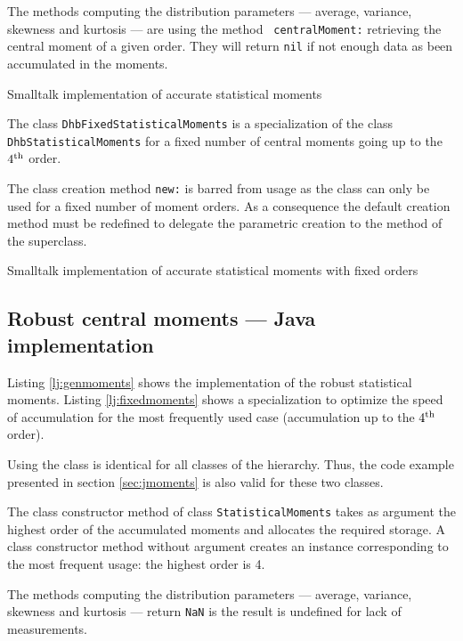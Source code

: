 \documentclass[twoside]{book}
\begin{document}
The methods computing the distribution parameters --- average,
variance, skewness and kurtosis --- are using the method {\tt
centralMoment:} retrieving the central moment of a given order.
They will return {\tt nil} if not enough data as been accumulated
in the moments.

\begin{listing} Smalltalk implementation of accurate statistical moments \label{ls:genmoments}

\end{listing}

The class {\tt DhbFixedStatisticalMoments} is a specialization of
the class {\tt DhbStatisticalMoments} for a fixed number of
central moments going up to the $4^{\mathop{\rm th}}$ order.

The class creation method {\tt new:} is barred from usage as the
class can only be used for a fixed number of moment orders. As a
consequence the default creation method must be redefined to
delegate the parametric creation to the method of the superclass.

\begin{listing} Smalltalk implementation of accurate statistical moments with fixed orders \label{ls:fixedmoments}

\end{listing}

\subsection{Robust central moments --- Java
implementation} \label{sec:jrobustmoment} Listing
\ref{lj:genmoments} shows the implementation of the robust
statistical moments. Listing \ref{lj:fixedmoments} shows a
specialization to optimize the speed of accumulation for the most
frequently used case (accumulation up to the $4^{\mathop{\rm th}}$ order).

Using the class is identical for all classes of the hierarchy.
Thus, the code example presented in section \ref{sec:jmoments} is
also valid for these two classes.

The class constructor method of class {\tt StatisticalMoments}
takes as argument the highest order of the accumulated moments and
allocates the required storage. A class constructor method without
argument creates an instance corresponding to the most frequent
usage: the highest order is 4.

The methods computing the distribution parameters --- average,
variance, skewness and kurtosis --- return {\tt NaN} is the result
is undefined for lack of measurements.
\end{document}
